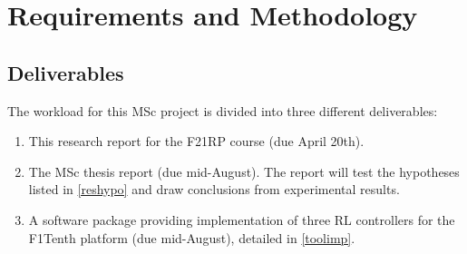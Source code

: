 
\chapter{Requirements and Methodology} %

\label{Chapter3} %



\section{Deliverables}
\label{deliv}

The workload for this MSc project is divided into three different deliverables:

\begin{enumerate}
	\item This research report for the F21RP course (due April 20th).
	\item The MSc thesis report (due mid-August). The report will test the hypotheses listed in \ref{reshypo} and draw conclusions from experimental results.
	\item A software package providing implementation of three RL controllers for the F1Tenth platform (due mid-August), detailed in \ref{toolimp}.
\end{enumerate}

